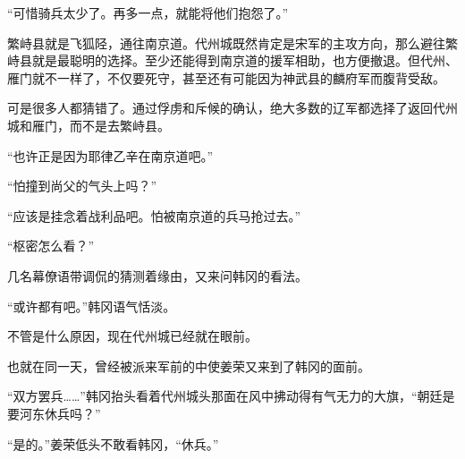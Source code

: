 “可惜骑兵太少了。再多一点，就能将他们抱怨了。”

繁峙县就是飞狐陉，通往南京道。代州城既然肯定是宋军的主攻方向，那么避往繁峙县就是最聪明的选择。至少还能得到南京道的援军相助，也方便撤退。但代州、雁门就不一样了，不仅要死守，甚至还有可能因为神武县的麟府军而腹背受敌。

可是很多人都猜错了。通过俘虏和斥候的确认，绝大多数的辽军都选择了返回代州城和雁门，而不是去繁峙县。

“也许正是因为耶律乙辛在南京道吧。”

“怕撞到尚父的气头上吗？”

“应该是挂念着战利品吧。怕被南京道的兵马抢过去。”

“枢密怎么看？”

几名幕僚语带调侃的猜测着缘由，又来问韩冈的看法。

“或许都有吧。”韩冈语气恬淡。

不管是什么原因，现在代州城已经就在眼前。

也就在同一天，曾经被派来军前的中使姜荣又来到了韩冈的面前。

“双方罢兵……”韩冈抬头看着代州城头那面在风中拂动得有气无力的大旗，“朝廷是要河东休兵吗？”

“是的。”姜荣低头不敢看韩冈，“休兵。”
